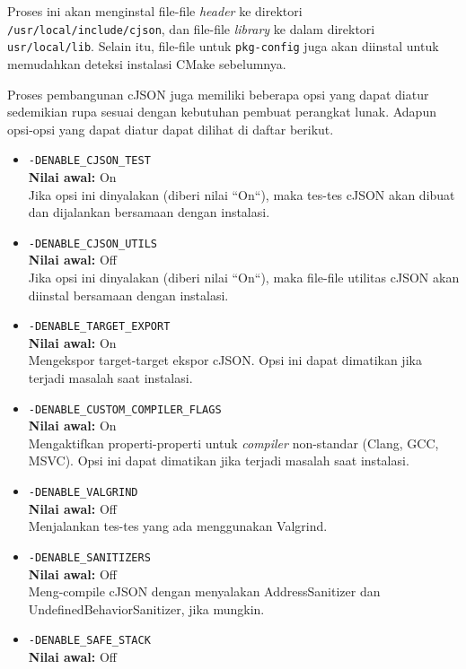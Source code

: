 \documentclass[a4paper,twoside]{article}
\begin{document}
\begin{enumerate}
\begin{itemize}
	Proses ini akan menginstal file-file \textit{header} ke direktori \verb|/usr/local/include/cjson|, dan file-file \textit{library} ke dalam direktori \verb|usr/local/lib|. Selain itu, file-file untuk \verb|pkg-config| juga akan diinstal untuk memudahkan deteksi instalasi CMake sebelumnya.
	
	Proses pembangunan cJSON juga memiliki beberapa opsi yang dapat diatur sedemikian rupa sesuai dengan kebutuhan pembuat perangkat lunak. Adapun opsi-opsi yang dapat diatur dapat dilihat di daftar berikut.

	\begin{itemize}
		\item \verb|-DENABLE_CJSON_TEST|\\
		\textbf{Nilai awal:} On\\
		Jika opsi ini dinyalakan (diberi nilai ``On``), maka tes-tes cJSON akan dibuat dan dijalankan bersamaan dengan instalasi.
		\item \verb|-DENABLE_CJSON_UTILS|\\
		\textbf{Nilai awal:} Off\\
		Jika opsi ini dinyalakan (diberi nilai ``On``), maka file-file utilitas cJSON akan diinstal  bersamaan dengan instalasi.
		\item \verb|-DENABLE_TARGET_EXPORT|\\
		\textbf{Nilai awal:} On\\
		Mengekspor target-target ekspor cJSON. Opsi ini dapat dimatikan jika terjadi masalah saat instalasi.
		\item \verb|-DENABLE_CUSTOM_COMPILER_FLAGS|\\
		\textbf{Nilai awal:} On\\
		Mengaktifkan properti-properti untuk \textit{compiler} non-standar (Clang, GCC, MSVC). Opsi ini dapat dimatikan jika terjadi masalah saat instalasi.
		\item \verb|-DENABLE_VALGRIND|\\
		\textbf{Nilai awal:} Off\\
		Menjalankan tes-tes yang ada menggunakan \mbox{Valgrind}.
		\item \verb|-DENABLE_SANITIZERS|\\
		\textbf{Nilai awal:} Off\\
		Meng-compile cJSON dengan menyalakan \mbox{AddressSanitizer} dan \mbox{UndefinedBehaviorSanitizer}, jika mungkin.
		\item \verb|-DENABLE_SAFE_STACK|\\
		\textbf{Nilai awal:} Off\\

\end{itemize}
\end{itemize}
\end{enumerate}
\end{document}
